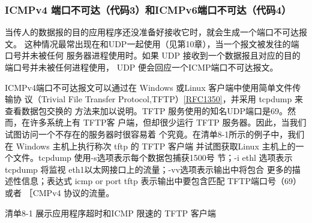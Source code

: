\subsubsection{ICMPv4 端口不可达（代码3）和ICMPv6端口不可达（代码4）}
当传人的数据报的目的应用程序还没准备好接收它时，就会生成一个端口不可达报文。
这种情况最常出现在和UDP一起使用（见第10章），当一个报文被发往的端口号并未被任何
服务器进程使用时。如果 UDP 接收到一个数据报且对应的目的端口号并未被任何进程使用，
UDP 便会回应一个ICMP端口不可达报文。

ICMPv4端口不可达报文可以通过在 Windows 或Linux 客户端中使用简单文件传输协
议（Trivial File Transfer
Protocol,TFTP）\href{https://www.rfc-editor.org/rfc/rfc1350}{[RFC1350]}，并采用
tcpdump 来查看数据包交换的
方法来加以说明。TFTP 服务使用的知名UDP端口是69。然而，在许多系统上有 TFTP客
户端，但却很少运行 TFTP 服务器。因此，当我们试图访问一个不存在的服务器时很容易着
个究竟。在清单8-1所示的例子中，我们在 Windows 主机上执行称次 tftp 的 TFTP 客户端
并试图获取Linux 主机上的一个文件。tcpdump 使用-s选项表示每个数据包捕获1500号
节；-i ethl 选项表示 tcpdump 将监视 eth1以太网接口上的流量；-vv选项表示输出中将包合
更多的描述性信息；表达式 icmp or port tftp 表示输出中要包含匹配 TFTP端口号（69）或者
［CMPv4 协议的流量。

清单8-1 展示应用程序超时和ICMP 限速的 TFTP 客户端

